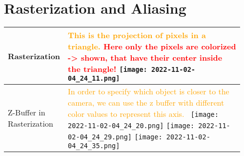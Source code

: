 \documentclass[main.tex,fontsize=8pt,paper=a4,paper=portrait,DIV=calc,]{scrartcl}
\begin{document}
\pagebreak
\begin{table}[ht!]
\section{Rasterization and Aliasing}
\begin{tabular}{|m{0.2\linewidth}|m{0.755\linewidth}|}
\hline
Rasterization & 
\textcolor{orange}{This is the projection of pixels in a triangle.}\newline
\textcolor{red}{\textbf{Here only the pixels are colorized -> shown, that have their center inside the triangle!}}\newline
\texttt{[image: 2022-11-02-04\_24\_11.png]}\\
\hline
Z-Buffer in Rasterization & 
\textcolor{orange}{In order to specify which object is closer to the camera, we can use the z buffer with different color values to represent this axis.}\newline
\, \newline
\texttt{[image: 2022-11-02-04\_24\_20.png]}
\texttt{[image: 2022-11-02-04\_24\_29.png]}
\texttt{[image: 2022-11-02-04\_24\_35.png]}\\
\hline
\end{tabular}
\end{table}
\pagebreak
\end{document}

